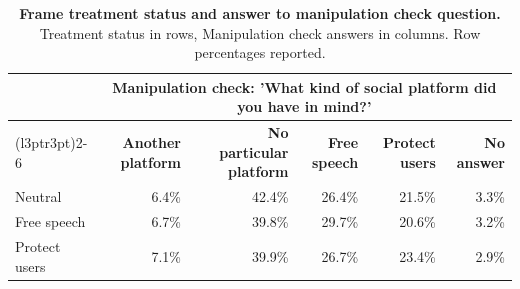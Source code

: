 \begin{table}

\caption{\label{tab:frame-manipcheck}\textbf{Frame treatment status and answer to manipulation check question.} Treatment status in rows, Manipulation check answers in columns. Row percentages reported.}
\centering
\begin{tabular}[t]{lrrrrr}
\toprule
\multicolumn{1}{c}{ } & \multicolumn{5}{c}{Manipulation check: 'What kind of social platform did you have in mind?'} \\
\cmidrule(l{3pt}r{3pt}){2-6}
\textbf{} & \textbf{Another platform} & \textbf{No particular platform} & \textbf{Free speech} & \textbf{Protect users} & \textbf{No answer}\\
\midrule
Neutral & 6.4\% & 42.4\% & 26.4\% & 21.5\% & 3.3\%\\
Free speech & 6.7\% & 39.8\% & 29.7\% & 20.6\% & 3.2\%\\
Protect users & 7.1\% & 39.9\% & 26.7\% & 23.4\% & 2.9\%\\
\bottomrule
\end{tabular}
\end{table}
